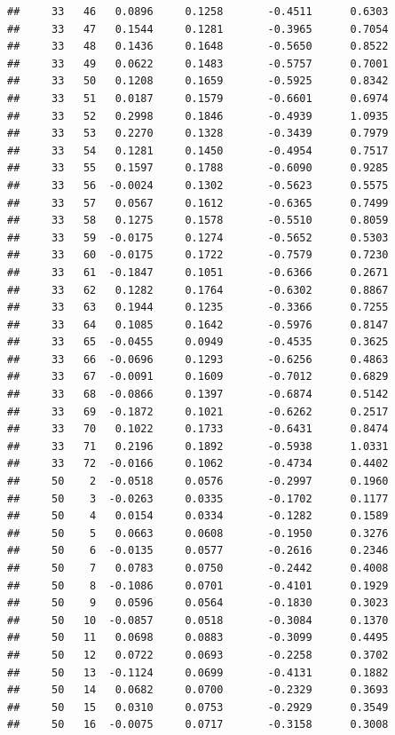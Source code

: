 \documentclass[
]{article}
\begin{document}
\begin{verbatim}
##     33   46   0.0896     0.1258       -0.4511      0.6303 
##     33   47   0.1544     0.1281       -0.3965      0.7054 
##     33   48   0.1436     0.1648       -0.5650      0.8522 
##     33   49   0.0622     0.1483       -0.5757      0.7001 
##     33   50   0.1208     0.1659       -0.5925      0.8342 
##     33   51   0.0187     0.1579       -0.6601      0.6974 
##     33   52   0.2998     0.1846       -0.4939      1.0935 
##     33   53   0.2270     0.1328       -0.3439      0.7979 
##     33   54   0.1281     0.1450       -0.4954      0.7517 
##     33   55   0.1597     0.1788       -0.6090      0.9285 
##     33   56  -0.0024     0.1302       -0.5623      0.5575 
##     33   57   0.0567     0.1612       -0.6365      0.7499 
##     33   58   0.1275     0.1578       -0.5510      0.8059 
##     33   59  -0.0175     0.1274       -0.5652      0.5303 
##     33   60  -0.0175     0.1722       -0.7579      0.7230 
##     33   61  -0.1847     0.1051       -0.6366      0.2671 
##     33   62   0.1282     0.1764       -0.6302      0.8867 
##     33   63   0.1944     0.1235       -0.3366      0.7255 
##     33   64   0.1085     0.1642       -0.5976      0.8147 
##     33   65  -0.0455     0.0949       -0.4535      0.3625 
##     33   66  -0.0696     0.1293       -0.6256      0.4863 
##     33   67  -0.0091     0.1609       -0.7012      0.6829 
##     33   68  -0.0866     0.1397       -0.6874      0.5142 
##     33   69  -0.1872     0.1021       -0.6262      0.2517 
##     33   70   0.1022     0.1733       -0.6431      0.8474 
##     33   71   0.2196     0.1892       -0.5938      1.0331 
##     33   72  -0.0166     0.1062       -0.4734      0.4402 
##     50    2  -0.0518     0.0576       -0.2997      0.1960 
##     50    3  -0.0263     0.0335       -0.1702      0.1177 
##     50    4   0.0154     0.0334       -0.1282      0.1589 
##     50    5   0.0663     0.0608       -0.1950      0.3276 
##     50    6  -0.0135     0.0577       -0.2616      0.2346 
##     50    7   0.0783     0.0750       -0.2442      0.4008 
##     50    8  -0.1086     0.0701       -0.4101      0.1929 
##     50    9   0.0596     0.0564       -0.1830      0.3023 
##     50   10  -0.0857     0.0518       -0.3084      0.1370 
##     50   11   0.0698     0.0883       -0.3099      0.4495 
##     50   12   0.0722     0.0693       -0.2258      0.3702 
##     50   13  -0.1124     0.0699       -0.4131      0.1882 
##     50   14   0.0682     0.0700       -0.2329      0.3693 
##     50   15   0.0310     0.0753       -0.2929      0.3549 
##     50   16  -0.0075     0.0717       -0.3158      0.3008 

\end{verbatim}
\end{document}
